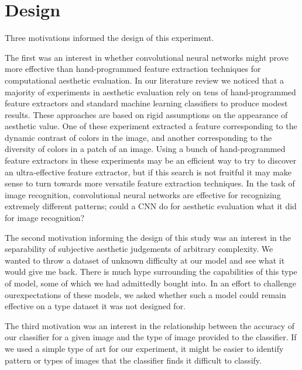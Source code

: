 \documentclass[midd]{thesis}
\begin{document}
\chapter{Design}



Three motivations informed the design of this experiment.

The first was an interest in whether convolutional neural networks might prove more effective than hand-programmed feature extraction techniques for computational aesthetic evaluation. In our literature review we noticed that a majority of experiments in aesthetic evaluation rely on tens of hand-programmed feature extractors and standard machine learning classifiers to produce modest results. These approaches are based on rigid assumptions on the appearance of aesthetic value. One of these experiment extracted a feature corresponding to the dynamic contrast of colors in the image, and another corresponding to the diversity of colors in a patch of an image. Using a bunch of hand-programmed feature extractors in these experiments may be an efficient way to try to discover an ultra-effective feature extractor, but if this search is not fruitful it may make sense to turn towards more versatile feature extraction techniques. In the task of image recognition, convolutional neural networks are effective for recognizing extremely different patterns; could a CNN do for aesthetic evaluation what it did for image recognition?

The second motivation informing the design of this study was an interest in the separability of subjective aesthetic judgements of arbitrary complexity. We wanted to throw a dataset of unknown difficulty at our model and see what it would give me back. There is much hype surrounding the capabilities of this type of model, some of which we had admittedly bought into. In an effort to challenge ourexpectations of these models, we asked whether such a model could remain effective on a type dataset it was not designed for.

The third motivation was an interest in the relationship between the accuracy of our classifier for a given image and the type of image provided to the classifier. If we used a simple type of art for our experiment, it might be easier to identify pattern or types of images that the classifier finds it difficult to classify.
\end{document}

